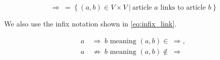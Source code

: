\begin{equation}
\label{eq:binary_relation}
\Rightarrow\ =\ \{\ (a,b) \in V \times V\ |\ \text{article } a \text{ links to article } b\ \}
\end{equation}

We also use the infix notation shown in \cref{eq:infix_link}.

\begin{equation}
\label{eq:infix_link}
  \begin{split}
    a\ & \Rightarrow\ b \text{ meaning } (a,b) \in\ \Rightarrow,\\
    a\ & \not\Rightarrow\ b \text{ meaning } (a,b) \not\in\ \Rightarrow
  \end{split}
\end{equation}


